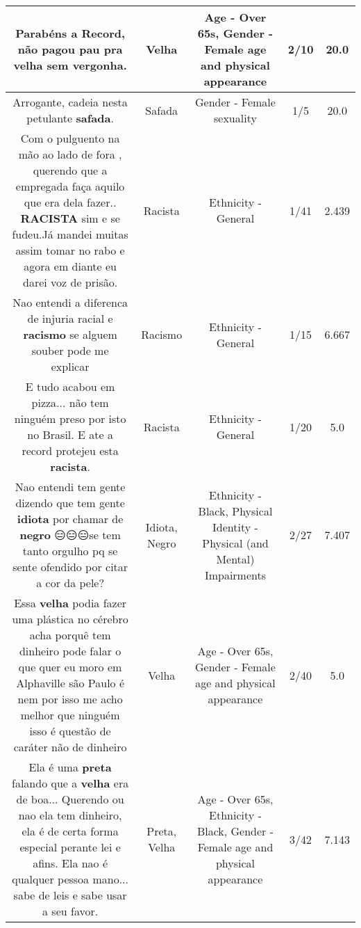 \documentclass[11pt]{article}
\newlength\mylength
\begin{document}
\begin{center}
\begin{longtable}{|C{.65\mylength}|C{.30\mylength}|C{.12\mylength}|C{.12\mylength}|C{.12\mylength}|}
  \small Parabéns a Record, não pagou pau pra \textbf{v\textbf{elha}} sem vergonha.\normalsize   & Velha & Age - Over 65s, Gender - Female age and physical appearance & 2/10 & 20.0 \\  \hline
  \small Arrogante, cadeia nesta petulante \textbf{safada}.\normalsize   & Safada & Gender - Female sexuality & 1/5 & 20.0 \\  \hline
  \small Com o pulguento na mão ao lado de fora , querendo que a empregada faça aquilo que era dela fazer.. \textbf{RACISTA} sim e se fudeu.Já mandei muitas assim tomar no rabo e agora em diante eu darei voz de prisão.\normalsize   & Racista & Ethnicity - General & 1/41 & 2.439 \\  \hline
  \small Nao entendi a diferenca de injuria racial e \textbf{racismo} se alguem souber pode me explicar\normalsize   & Racismo & Ethnicity - General & 1/15 & 6.667 \\  \hline
  \small E tudo acabou em pizza... não tem ninguém preso por isto no Brasil. E ate a record protejeu esta \textbf{racista}.\normalsize   & Racista & Ethnicity - General & 1/20 & 5.0 \\  \hline
  \small Nao entendi tem gente dizendo que  tem gente \textbf{idiota} por chamar de \textbf{negro} 😑😑😑se tem tanto orgulho pq se sente ofendido por citar a cor da pele?\normalsize   & Idiota, Negro & Ethnicity - Black, Physical Identity - Physical (and Mental) Impairments & 2/27 & 7.407 \\  \hline
  \small Essa \textbf{v\textbf{elha}} podia fazer uma plástica  no cérebro  acha porquê tem dinheiro pode falar o que quer  eu moro em Alphaville são Paulo  é nem por isso me acho melhor que ninguém isso é questão de caráter não de dinheiro\normalsize   & Velha & Age - Over 65s, Gender - Female age and physical appearance & 2/40 & 5.0 \\  \hline
  \small Ela é uma \textbf{preta} falando que a \textbf{v\textbf{elha}} era de boa... Querendo ou nao ela tem dinheiro, ela é de certa forma especial perante lei e afins. Ela nao é qualquer pessoa mano... sabe de leis e sabe usar a seu favor.\normalsize   & Preta, Velha & Age - Over 65s, Ethnicity - Black, Gender - Female age and physical appearance & 3/42 & 7.143 \\  \hline

\end{longtable}
\end{center}
\end{document}
